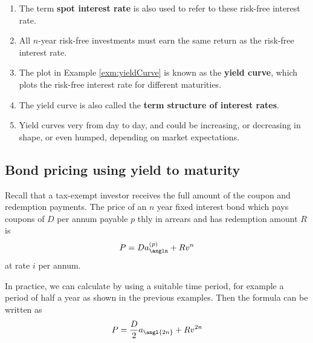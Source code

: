 \documentclass[
]{article}
\theoremstyle{definition}
\theoremstyle{definition}
\theoremstyle{definition}
\theoremstyle{definition}
\theoremstyle{remark}
\begin{document}
\begin{enumerate}
\def\labelenumi{\arabic{enumi}.}
\setcounter{enumi}{1}
\item
  The term \textbf{spot interest rate} is also used to refer to these
  risk-free interest rate.
\item
  All \(n\)-year risk-free investments must earn the same return as the
  risk-free interest rate.
\item
  The plot in Example \ref{exm:yieldCurve} is known as the \textbf{yield curve}, which plots
  the risk-free interest rate for different maturities.
\item
  The yield curve is also called the \textbf{term structure of interest
  rates}.
\item
  Yield curves very from day to day, and could be increasing, or
  decreasing in shape, or even humped, depending on market
  expectations.
\end{enumerate}

\hypertarget{bond-pricing-using-yield-to-maturity}{%
\subsection{Bond pricing using yield to maturity}\label{bond-pricing-using-yield-to-maturity}}

Recall that a tax-exempt investor receives the full amount of the coupon
and redemption payments. The price of an \(n\) year fixed interest bond
which pays coupons of \(D\) per annum payable \(p\) thly in arrears and has
redemption amount \(R\) is \[P = D a_{\angln}^{(p)} + R v^n\] at rate \(i\)
per annum.

In practice, we can calculate by using a suitable time period, for
example a period of half a year as shown in the previous examples. Then
the formula can be written as
\[P = \frac{D}{2} a_{\angl{2n}} + R v^{2n}\]
\end{document}
